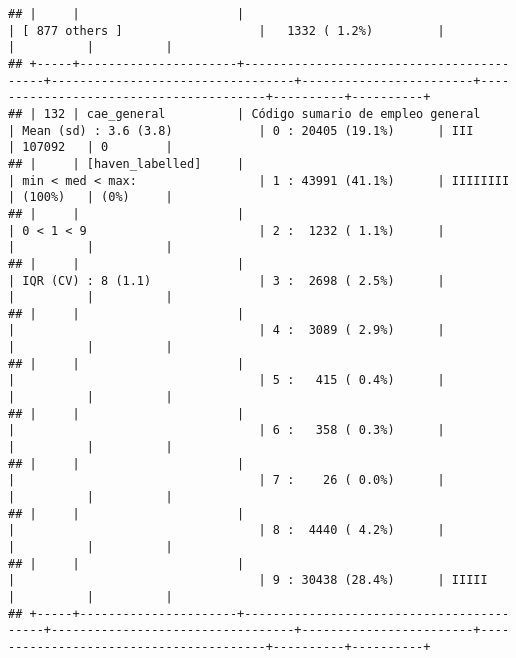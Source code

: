 \documentclass[]{article}
\begin{document}
\begin{verbatim}
## |     |                      |                                          | [ 877 others ]                   |   1332 ( 1.2%)         |                                        |          |          |
## +-----+----------------------+------------------------------------------+----------------------------------+------------------------+----------------------------------------+----------+----------+
## | 132 | cae_general          | Código sumario de empleo general         | Mean (sd) : 3.6 (3.8)            | 0 : 20405 (19.1%)      | III                                    | 107092   | 0        |
## |     | [haven_labelled]     |                                          | min < med < max:                 | 1 : 43991 (41.1%)      | IIIIIIII                               | (100%)   | (0%)     |
## |     |                      |                                          | 0 < 1 < 9                        | 2 :  1232 ( 1.1%)      |                                        |          |          |
## |     |                      |                                          | IQR (CV) : 8 (1.1)               | 3 :  2698 ( 2.5%)      |                                        |          |          |
## |     |                      |                                          |                                  | 4 :  3089 ( 2.9%)      |                                        |          |          |
## |     |                      |                                          |                                  | 5 :   415 ( 0.4%)      |                                        |          |          |
## |     |                      |                                          |                                  | 6 :   358 ( 0.3%)      |                                        |          |          |
## |     |                      |                                          |                                  | 7 :    26 ( 0.0%)      |                                        |          |          |
## |     |                      |                                          |                                  | 8 :  4440 ( 4.2%)      |                                        |          |          |
## |     |                      |                                          |                                  | 9 : 30438 (28.4%)      | IIIII                                  |          |          |
## +-----+----------------------+------------------------------------------+----------------------------------+------------------------+----------------------------------------+----------+----------+

\end{verbatim}
\end{document}
